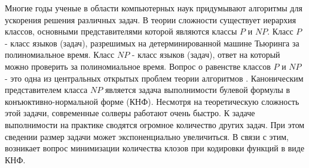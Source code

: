 
Многие годы ученые в области компьютерных наук придумывают алгоритмы для ускорения решения различных задач. В теории сложности существует иерархия классов, основными представителями которой являются классы $P$ и $NP$. Класс $P$ - класс языков (задач), разрешимых на детерминированной машине Тьюринга за полиномиальное время. Класс $NP$ - класс языков (задач), ответ на который можно проверить за полиномиальное время. Вопрос о равенстве классов $P$ и $NP$ - это одна из центральных открытых проблем теории алгоритмов \cite{cook2000p}. Каноническим представителем класса $NP$ является задача выполнимости булевой формулы в конъюктивно-нормальной форме (КНФ). Несмотря на теоретическую сложность этой задачи, современные солверы работают очень быстро. К задаче выполнимости на практике сводятся огромное количество других задач. При этом сведении размер задачи может экспоненциально увеличиться. В связи с этим, возникает вопрос минимизации количества клозов при кодировки функций в виде КНФ.